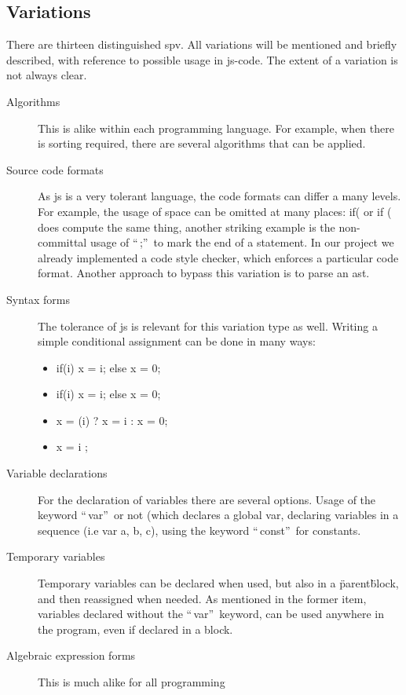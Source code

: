 \subsection{Variations} %
There are thirteen distinguished \gls{spv}. All variations will be mentioned and
briefly described, with reference to possible usage in \gls{js-code}. 
The extent of a variation is not always clear. 
\begin{description}
	\item[Algorithms] This is alike within each programming language. For example,
	when there is sorting required, there are several algorithms that can be 
	applied.
	\item[Source code formats] As \gls{js} is a very tolerant language, the
	code formats can differ a many levels. For example, the usage of space can be
	omitted at many places: if( or if ( does compute the same thing, another
	striking example is the non-committal usage of ``\,;''\, to mark the end
	of a statement. In our project we already implemented a code style checker, 
	which enforces a particular code format. Another approach to bypass this 
	variation is to parse an \gls{ast}.
	\item[Syntax forms] The tolerance of \gls{js} is relevant for this variation
	type as well. Writing a simple conditional assignment can be done in many 
	ways:
	\begin{itemize}
		\item if(i) x = i; else x = 0;
		\item if(i) { x = i;} else { x = 0;}
		\item x = (i) ? x = i : x = 0;
		\item x = i \textbar \textbar 0;
	\end{itemize}
	\item[Variable declarations] For the declaration of variables there are 
	several options. Usage of the keyword ``\,var''\, or not (which declares a global 
	var, declaring variables in a sequence (i.e var a, b, c), using the keyword 
	``\,const''\, for constants.
	\item[Temporary variables] Temporary variables can be declared when used, but
	also in a \"parent\" block, and then reassigned when needed. As mentioned in
	the former item, variables declared without the ``\,var''\, keyword, can be used
	anywhere in the program, even if declared in a block.
	\item[Algebraic expression forms] This is much alike for all programming

\end{description}
